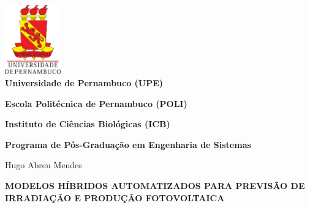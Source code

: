 
\thispagestyle{empty}

\begin{center}

\includegraphics[height=30mm]{Figuras/Capa/brasao_upe}\\


{\textbf{Universidade de Pernambuco (UPE)}}%

{\textbf{Escola Politécnica de Pernambuco (POLI)}}%

{\textbf{Instituto de Ciências Biológicas (ICB)}} \\ \vspace{2ex}

{\textbf{Programa de Pós-Graduação em Engenharia de Sistemas}} \\ \vspace{1ex}

\vspace{0.8in}

{\Large Hugo Abreu Mendes}\\

\vspace{1in}

{\Large \textbf{MODELOS HÍBRIDOS AUTOMATIZADOS PARA PREVISÃO DE IRRADIAÇÃO E PRODUÇÃO FOTOVOLTAICA}} \\

\vspace{0.3in}




\end{center}

